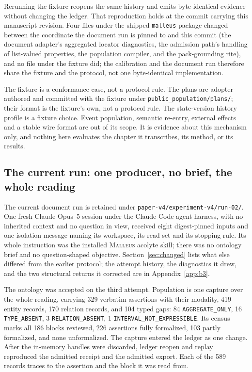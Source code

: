 \documentclass[10pt]{article}
\newcommand{\malleus}{\textsc{Malleus}}
\newcommand{\code}[1]{\texttt{#1}}
\begin{document}
Rerunning the fixture reopens the same history and emits byte-identical evidence without changing the ledger. That reproduction holds at the commit carrying this manuscript revision. Four files under the shipped \code{malleus} package changed between the coordinate the document run is pinned to and this commit (the document adapter's aggregated locator diagnostics, the admission path's handling of list-valued properties, the population compiler, and the pack-grounding rite), and no file under the fixture did; the calibration and the document run therefore share the fixture and the protocol, not one byte-identical implementation.

The fixture is a conformance case, not a protocol rule. The plans are adopter-authored and committed with the fixture under \code{public\_population/plans/}; their format is the fixture's own, not a protocol rule. The state-version history profile is a fixture choice. Event population, semantic re-entry, external effects and a stable wire format are out of its scope. It is evidence about this mechanism only, and nothing here evaluates the chapter it transcribes, its method, or its results.

\subsection{The current run: one producer, no brief, the whole reading}
\label{sec:current}

The current document run is retained under \code{paper-v4/experiment-v4/run-02/}. One fresh Claude Opus~5 session under the Claude Code agent harness, with no inherited context and no question in view, received eight digest-pinned inputs and one isolation message naming its workspace, its read set and its stopping rule. Its whole instruction was the installed \malleus{} acolyte skill; there was no ontology brief and no question-shaped objective. Section~\ref{sec:changed} lists what else differed from the earlier protocol; the attempt history, the diagnostics it drew, and the two structural returns it corrected are in Appendix~\ref{app:b3}.

The ontology was accepted on the third attempt. Population is one capture over the whole reading, carrying 329 verbatim assertions with their modality, 419 entity records, 170 relation records, and 104 typed gaps: 84 \code{AGGREGATE\_ONLY}, 16 \code{TYPE\_ABSENT}, 3 \code{RELATION\_ABSENT}, 1 \code{INTERVAL\_NOT\_EXPRESSIBLE}. Its census marks all 186 blocks reviewed, 226 assertions fully formalized, 103 partly formalized, and none unformalized. The capture entered the ledger as one change. After the in-memory handles were discarded, ledger reopen and replay reproduced the admitted receipt and the admitted export. Each of the 589 records traces to the assertion and the block it was read from.
\end{document}
